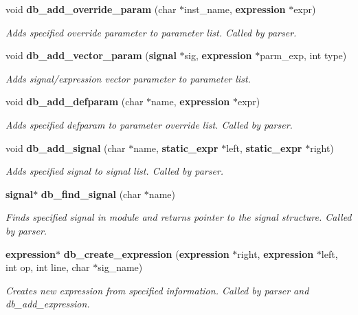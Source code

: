 \begin{CompactItemize}
void {\bf db\_\-add\_\-override\_\-param} (char $\ast$inst\_\-name, {\bf expression} $\ast$expr)
\begin{CompactList}\small\item\em Adds specified override parameter to parameter list. Called by parser.\item\end{CompactList}\item 
void {\bf db\_\-add\_\-vector\_\-param} ({\bf signal} $\ast$sig, {\bf expression} $\ast$parm\_\-exp, int type)
\begin{CompactList}\small\item\em Adds signal/expression vector parameter to parameter list.\item\end{CompactList}\item 
void {\bf db\_\-add\_\-defparam} (char $\ast$name, {\bf expression} $\ast$expr)
\begin{CompactList}\small\item\em Adds specified defparam to parameter override list. Called by parser.\item\end{CompactList}\item 
void {\bf db\_\-add\_\-signal} (char $\ast$name, {\bf static\_\-expr} $\ast$left, {\bf static\_\-expr} $\ast$right)
\begin{CompactList}\small\item\em Adds specified signal to signal list. Called by parser.\item\end{CompactList}\item 
{\bf signal}$\ast$ {\bf db\_\-find\_\-signal} (char $\ast$name)
\begin{CompactList}\small\item\em Finds specified signal in module and returns pointer to the signal structure. Called by parser.\item\end{CompactList}\item 
{\bf expression}$\ast$ {\bf db\_\-create\_\-expression} ({\bf expression} $\ast$right, {\bf expression} $\ast$left, int op, int line, char $\ast$sig\_\-name)
\begin{CompactList}\small\item\em Creates new expression from specified information. Called by parser and db\_\-add\_\-expression.\item\end{CompactList}\item 

\end{CompactItemize}
